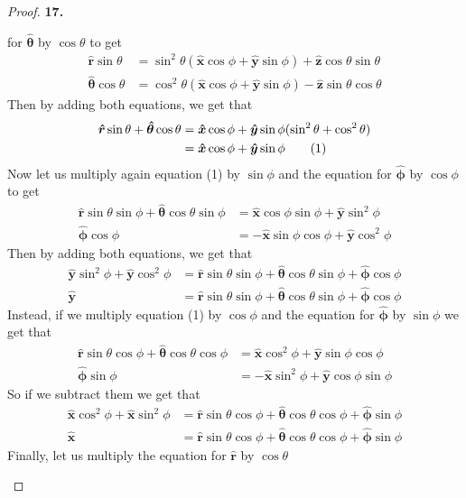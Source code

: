\documentclass[11pt]{article}
\newcommand{\hatx}{\bm{\hat{x}}}
\newcommand{\haty}{\bm{\hat{y}}}
\newcommand{\hatz}{\bm{\hat{z}}}
\newcommand{\hatphi}{\bm{\hat{\phi}}}
\newcommand{\hatr}{\bm{\hat{r}}}
\newcommand{\hattheta}{\bm{\hat{\theta}}}
\newcommand\numberthis{\addtocounter{equation}{1}\tag{\theequation}}
\theoremstyle{definition}
\begin{document}
\begin{proof}{\textbf{17.}}
\begin{itemize}
    for $\hattheta$ by $\cos\theta$ to get
    \begin{align*}
        \hatr\sin\theta &= \sin^2\theta(
            \hatx\cos\phi + \haty\sin\phi) + \hatz\cos\theta\sin\theta\\
        \hattheta\cos\theta &= \cos^2\theta(
            \hatx\cos\phi + \haty\sin\phi) - \hatz\sin\theta\cos\theta
    \end{align*}
    Then by adding both equations, we get that
    \begin{align*}
        \hatr\sin\theta + \hattheta\cos\theta
        &= \hatx\cos\phi + \haty\sin\phi(\sin^2\theta + \cos^2\theta)\\
        &= \hatx\cos\phi + \haty\sin\phi \numberthis
    \end{align*}
    Now let us multiply again equation (1) by $\sin\phi$ and the equation
    for $\hatphi$ by $\cos\phi$ to get 
    \begin{align*}
        \hatr\sin\theta\sin\phi + \hattheta\cos\theta\sin\phi
        &= \hatx\cos\phi\sin\phi + \haty\sin^2\phi\\
        \hatphi\cos\phi &= -\hatx \sin\phi\cos\phi + \haty\cos^2\phi
    \end{align*}
    Then by adding both equations, we get that
    \begin{align*}
        \haty\sin^2\phi + \haty\cos^2\phi
        &=
        \hatr\sin\theta\sin\phi + \hattheta\cos\theta\sin\phi + \hatphi\cos\phi\\
        \haty &=
        \hatr\sin\theta\sin\phi + \hattheta\cos\theta\sin\phi + \hatphi\cos\phi
    \end{align*}
    Instead, if we multiply equation (1) by $\cos\phi$ and the equation
    for $\hatphi$ by $\sin\phi$ we get that
    \begin{align*}
        \hatr\sin\theta\cos\phi + \hattheta\cos\theta\cos\phi
        &= \hatx\cos^2\phi + \haty\sin\phi\cos\phi\\
        \hatphi\sin\phi &= -\hatx \sin^2\phi + \haty\cos\phi\sin\phi
    \end{align*}
    So if we subtract them we get that
    \begin{align*}
        \hatx\cos^2\phi + \hatx \sin^2\phi &=
        \hatr\sin\theta\cos\phi + \hattheta\cos\theta\cos\phi
        + \hatphi\sin\phi\\
        \hatx &=
        \hatr\sin\theta\cos\phi + \hattheta\cos\theta\cos\phi
        + \hatphi\sin\phi 
    \end{align*}
    Finally, let us multiply the equation for $\hatr$ by $\cos\theta$

\end{itemize}
\end{proof}
\end{document}
